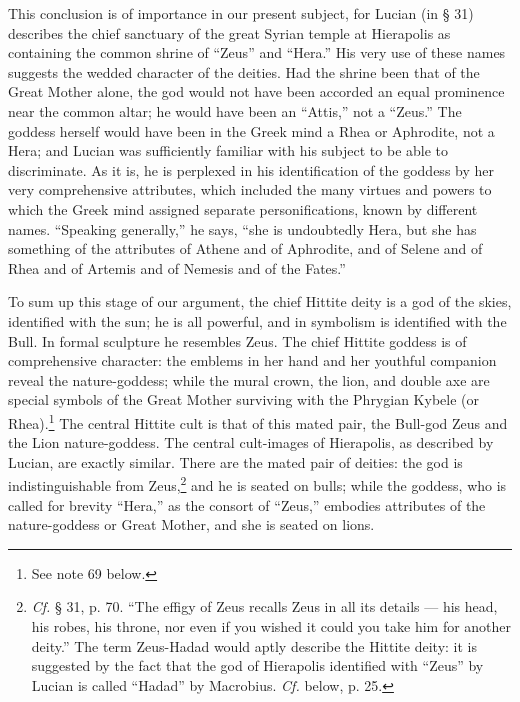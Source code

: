 \documentclass[a4paper, 11pt, oneside, polutonikogreek, english]{article}
\begin{document}
This conclusion is of importance in our present subject, for Lucian (in § 31) describes the chief sanctuary of the great Syrian temple at Hierapolis as containing the common shrine of ``Zeus'' and ``Hera.'' His very use of these names suggests the wedded character of the deities. Had the shrine been that of the Great Mother alone, the god would not have been accorded an equal prominence near the common altar; he would have been an ``Attis,'' not a ``Zeus.'' The goddess herself would have been in the Greek mind a Rhea or Aphrodite, not a Hera; and Lucian was sufficiently familiar with his subject to be able to discriminate. As it is, he is perplexed in his identification of the goddess by her very comprehensive attributes, which included the many virtues and powers to which the Greek mind assigned separate personifications, known by different names. ``Speaking generally,'' he says, ``she is undoubtedly Hera, but she has something of the attributes of Athene and of Aphrodite, and of Selene and of Rhea and of Artemis and of Nemesis and of the Fates.''

To sum up this stage of our argument, the chief Hittite deity is a god of the skies, identified with the sun; he is all powerful, and in symbolism is identified with the Bull. In formal sculpture he resembles Zeus. The chief Hittite goddess is of comprehensive character: the emblems in her hand and her youthful companion reveal the nature-goddess; while the mural crown, the lion, and double axe are special symbols of the Great Mother surviving with the Phrygian Kybele (or Rhea).\footnote{See note 69 below.} The central Hittite cult is that of this mated pair, the Bull-god Zeus and the Lion nature-goddess. The central cult-images of Hierapolis, as described by Lucian, are exactly similar. There are the mated pair of deities: the god is indistinguishable from Zeus,\footnote{\emph{Cf.} § 31, p. 70. ``The effigy of Zeus recalls Zeus in all its details --- his head, his robes, his throne, nor even if you wished it could you take him for another deity.'' The term Zeus-Hadad would aptly describe the Hittite deity: it is suggested by the fact that the god of Hierapolis identified with ``Zeus'' by Lucian is called ``Hadad'' by Macrobius. \emph{Cf.} below, p. 25.} and he is seated on bulls; while the goddess, who is called for brevity ``Hera,'' as the consort of ``Zeus,'' embodies attributes of the nature-goddess or Great Mother, and she is seated on lions.
\end{document}
